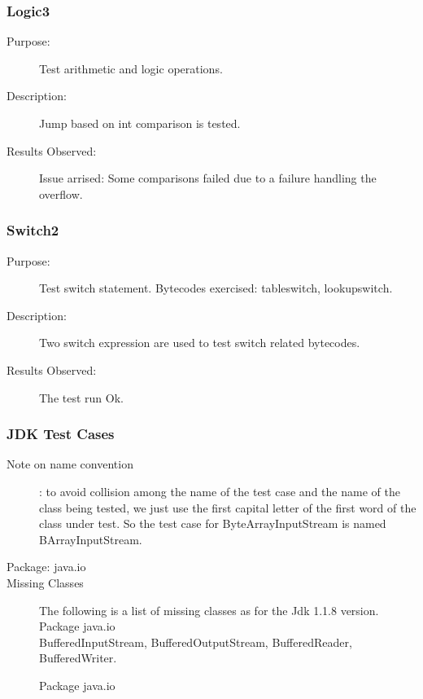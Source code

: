 \subsubsection{Logic3}
\begin{description}
   \item[Purpose:]
Test arithmetic and logic operations.
   \item[Description:]
Jump based on int comparison is tested.
   \item[Results Observed:]
Issue arrised: Some comparisons failed due to a failure handling the
overflow.
\end{description}


\subsubsection{Switch2}
\begin{description}
   \item[Purpose:]
Test switch statement. Bytecodes exercised: tableswitch,
lookupswitch.
   \item[Description:]
Two switch expression are used to test switch related bytecodes.
   \item[Results Observed:]
The test run Ok.
\end{description}

\subsubsection{JDK Test Cases}
\begin{description}
    \item[Note on name convention]

: to avoid collision among the name of the test case and the name of
the class being tested, we just use the first capital letter of the
first word of the class under test. So the test case for
ByteArrayInputStream is named BArrayInputStream.
    \item[Package: java.io]

    \item[Missing Classes]
The following is a list of missing classes as for the Jdk 1.1.8
version.
Package java.io\\
BufferedInputStream, BufferedOutputStream, BufferedReader, BufferedWriter.\\
\large \bf \begin{center} Package java.io \end{center}

\end{description}

